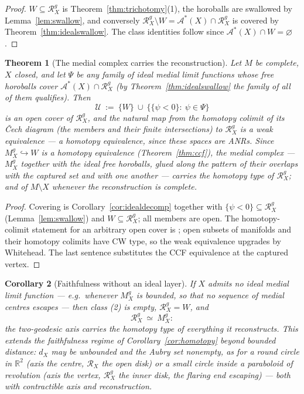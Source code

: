 \documentclass[11pt]{article}
\newtheorem{theorem}{Theorem}[section]
\newtheorem{corollary}[theorem]{Corollary}
\theoremstyle{remark}
\newcommand{\R}{\mathbb{R}}
\newcommand{\X}{X}
\newcommand{\Mg}{M^{g}_{\X}}
\newcommand{\Rx}{\mathcal{R}_{\X}}
\newcommand{\Rg}{\mathcal{R}^{g}_{\X}}
\newcommand{\dX}{d_{\X}}
\newcommand{\Aub}{\mathcal{A}^{\ast}}
\begin{document}
\begin{proof}
$W\subseteq\Rg$ is Theorem~\ref{thm:trichotomy}(1), the horoballs
are swallowed by Lemma~\ref{lem:swallow}, and conversely
$\Rg\setminus W=\Aub(\X)\cap\Rg$ is covered by
Theorem~\ref{thm:idealswallow}. The class identities follow since
$\Aub(\X)\cap W=\varnothing$.
\end{proof}

\begin{theorem}[The medial complex carries the reconstruction]
\label{thm:complex}
Let $M$ be complete, $\X$ closed, and let $\Psi$ be any family of
ideal medial limit functions whose free horoballs cover
$\Aub(\X)\cap\Rg$ (by Theorem~\ref{thm:idealswallow} the family of
\emph{all} of them qualifies). Then
\[
  \mathcal{U}\ :=\ \{W\}\ \cup\
  \bigl\{\{\psi<0\}:\ \psi\in\Psi\bigr\}
\]
is an open cover of $\Rg$, and the natural map from the homotopy
colimit of its \v{C}ech diagram (the members and their finite
intersections) to $\Rg$ is a weak equivalence \cite{DI} --- a
homotopy equivalence, since these spaces are ANRs. Since
$\Mg\hookrightarrow W$ is a homotopy equivalence
(Theorem~\ref{thm:ccf}), the \emph{medial complex} --- $\Mg$
together with the ideal free horoballs, glued along the pattern of
their overlaps with the captured set and with one another ---
carries the homotopy type of $\Rg$; and of $M\setminus\X$ whenever
the reconstruction is complete.
\end{theorem}

\begin{proof}
Covering is Corollary~\ref{cor:idealdecomp} together with
$\{\psi<0\}\subseteq\Rg$ (Lemma~\ref{lem:swallow}) and
$W\subseteq\Rg$; all members are open. The homotopy-colimit
statement for an arbitrary open cover is \cite{DI}; open subsets of
manifolds and their homotopy colimits have CW type, so the weak
equivalence upgrades by Whitehead. The last sentence substitutes the
CCF equivalence at the captured vertex.
\end{proof}

\begin{corollary}[Faithfulness without an ideal layer]
\label{cor:noideal}
If $\X$ admits no ideal medial limit function --- e.g.\ whenever
$\Mg$ is bounded, so that no sequence of medial centres escapes ---
then class \textup{(2)} is empty, $\Rg=W$, and
\[
  \Rg\ \simeq\ \Mg :
\]
the two-geodesic axis carries the homotopy type of everything it
reconstructs. This extends the faithfulness regime of
Corollary~\ref{cor:homotopy} beyond bounded distance: $\dX$ may be
unbounded and the Aubry set nonempty, as for a round circle in
$\R^{2}$ (axis the centre, $\Rx$ the open disk) or a small circle
inside a paraboloid of revolution (axis the vertex, $\Rg$ the inner
disk, the flaring end escaping) --- both with contractible axis and
reconstruction.
\end{corollary}
\end{document}
